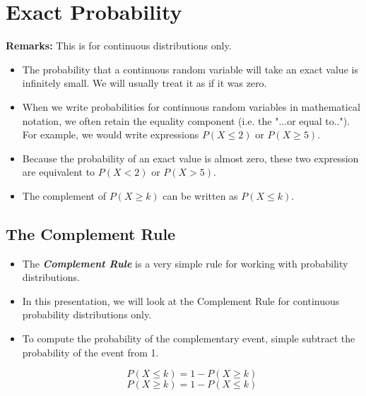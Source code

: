 \documentclass[]{report}
\begin{document}
	\section{Exact Probability}
	
	\textbf{Remarks:} This is for continuous distributions only.
	\begin{itemize}
		\item The probability that a continuous random variable will take an exact value is infinitely small.
		We will usually treat it as if it was zero.
		\item
		When we write probabilities for continuous random variables in mathematical notation, we often retain the equality component (i.e. the "...or equal to..").\\
		For example, we would write expressions $P(X \leq 2)$ or $P(X \geq 5)$.
		\item
		Because the probability of an exact value is almost zero, these two expression are equivalent to $P(X < 2)$
		or $P(X > 5)$. \item The complement of $P(X \geq k)$ can be written as $P(X \leq k)$.
	\end{itemize}
	

\subsection{The Complement Rule}
	
	\begin{itemize}
		\item The \textbf{\textit{Complement Rule}} is a very simple rule for working with probability distributions.
		\item In this presentation, we will look at the Complement Rule for continuous probability distributions only.
		
	\end{itemize}
	\begin{itemize}
		
		\item To compute the probability of the complementary event, simple subtract the probability of the event from 1.
		
		\[P(X \leq k) = 1- P(X \geq k) \]
		\[P(X \geq k) = 1- P(X \leq k) \]
	\end{itemize}	
	
	
	
\end{document}
